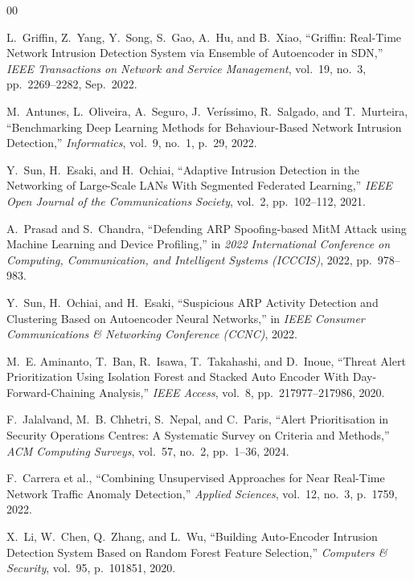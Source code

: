 \documentclass[conference]{IEEEtran}
\begin{document}
\begin{thebibliography}{00}
 
L.~Griffin, Z.~Yang, Y.~Song, S.~Gao, A.~Hu, and B.~Xiao,
``Griffin: Real-Time Network Intrusion Detection System via
Ensemble of Autoencoder in SDN,''
\textit{IEEE Transactions on Network and Service Management},
vol.~19, no.~3, pp.~2269--2282, Sep.~2022.
 
M.~Antunes, L.~Oliveira, A.~Seguro, J.~Veríssimo, R.~Salgado,
and T.~Murteira,
``Benchmarking Deep Learning Methods for Behaviour-Based Network
Intrusion Detection,''
\textit{Informatics},
vol.~9, no.~1, p.~29, 2022.
 
Y.~Sun, H.~Esaki, and H.~Ochiai,
``Adaptive Intrusion Detection in the Networking of Large-Scale LANs
With Segmented Federated Learning,''
\textit{IEEE Open Journal of the Communications Society},
vol.~2, pp.~102--112, 2021.
 
A.~Prasad and S.~Chandra,
``Defending ARP Spoofing-based MitM Attack using Machine Learning
and Device Profiling,''
in \textit{2022 International Conference on Computing, Communication,
and Intelligent Systems (ICCCIS)}, 2022, pp.~978--983.
 
Y.~Sun, H.~Ochiai, and H.~Esaki,
``Suspicious ARP Activity Detection and Clustering Based on Autoencoder
Neural Networks,''
in \textit{IEEE Consumer Communications \& Networking Conference
(CCNC)}, 2022.
 
M.~E. Aminanto, T.~Ban, R.~Isawa, T.~Takahashi, and D.~Inoue,
``Threat Alert Prioritization Using Isolation Forest and Stacked Auto
Encoder With Day-Forward-Chaining Analysis,''
\textit{IEEE Access},
vol.~8, pp.~217977--217986, 2020.
 
F.~Jalalvand, M.~B. Chhetri, S.~Nepal, and C.~Paris,
``Alert Prioritisation in Security Operations Centres: A Systematic
Survey on Criteria and Methods,''
\textit{ACM Computing Surveys},
vol.~57, no.~2, pp.~1--36, 2024.
 
F.~Carrera et al.,
``Combining Unsupervised Approaches for Near Real-Time Network Traffic
Anomaly Detection,''
\textit{Applied Sciences},
vol.~12, no.~3, p.~1759, 2022.


X.~Li, W.~Chen, Q.~Zhang, and L.~Wu,
``Building Auto-Encoder Intrusion Detection System Based on Random
Forest Feature Selection,''
\textit{Computers \& Security},
vol.~95, p.~101851, 2020.


\end{thebibliography}
\end{document}
